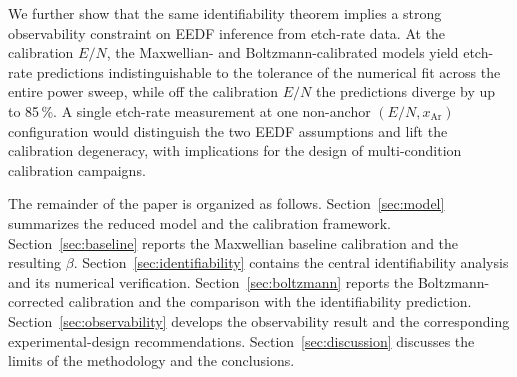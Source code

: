 We further show that the same identifiability theorem implies a
strong observability constraint on EEDF inference from etch-rate
data. At the calibration $E/N$, the Maxwellian- and
Boltzmann-calibrated models yield etch-rate predictions
indistinguishable to the tolerance of the numerical fit across the
entire power sweep, while off the calibration $E/N$ the predictions
diverge by up to 85\,\%. A single etch-rate measurement at one
non-anchor $(E/N, x_{\mathrm{Ar}})$ configuration would distinguish
the two EEDF assumptions and lift the calibration degeneracy, with
implications for the design of multi-condition calibration
campaigns.

The remainder of the paper is organized as follows.
Section~\ref{sec:model} summarizes the reduced model and the
calibration framework. Section~\ref{sec:baseline} reports the
Maxwellian baseline calibration and the resulting $\beta$.
Section~\ref{sec:identifiability} contains the central
identifiability analysis and its numerical verification.
Section~\ref{sec:boltzmann} reports the Boltzmann-corrected
calibration and the comparison with the identifiability prediction.
Section~\ref{sec:observability} develops the observability result
and the corresponding experimental-design recommendations.
Section~\ref{sec:discussion} discusses the limits of the methodology
and the conclusions.
